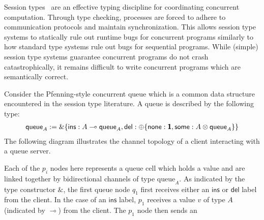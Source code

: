 Session types~\cite{honda93} are an effective typing discipline for coordinating
concurrent computation. Through type checking, processes are forced to adhere to
communication protocols and maintain synchronization. This allows session type
systems to statically rule out runtime bugs for concurrent programs similarly to
how standard type systems rule out bugs for sequential programs. While (simple)
session type systems guarantee concurrent programs do not crash catastrophically,
it remains difficult to write concurrent programs which are semantically correct.

Consider the Pfenning-style concurrent queue which is a common data structure encountered
in the session type literature. A queue is described by the following type:
\begin{align*}
  \textsf{queue}_A := \&\{
  \textsf{ins}: A \multimap \textsf{queue}_A,
  \textsf{del}: \oplus\{\textsf{none}: \textbf{\textsf{1}}, \textsf{some}: A \otimes \textsf{queue}_A\}
  \}
\end{align*}
The following diagram illustrates the channel topology of a client interacting with
a queue server.
\begin{center}
\vspace{0.4em}
\end{center}
Each of the $p_i$ nodes here represents a queue cell which holds a value and are
linked together by bidirectional channels of type $\text{queue}_A$.  As
indicated by the type constructor $\&$, the first queue node $q_1$ first
receives either an $\textsf{ins}$ or $\textsf{del}$ label from the client. In
the case of an $\textsf{ins}$ label, $p_1$ receives a value $v$ of type $A$
(indicated by $\multimap$) from the client.  The $p_1$ node then sends an
